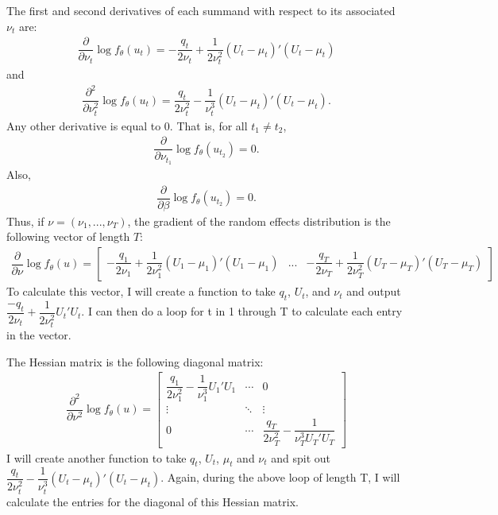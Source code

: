\documentclass{article}
\begin{document}

The first and second derivatives of each summand with respect to its associated $\nu_t$ are:
\begin{align}
\dfrac{\partial}{\partial \nu_t} \log f_\theta(u_t) = - \dfrac{q_t}{2 \nu_t} + \dfrac{1}{2 \nu_t^2}(U_t-\mu_t)'(U_t-\mu_t)
\end{align}
and 
\begin{align}
\dfrac{\partial^2}{\partial \nu_t^2} \log f_\theta(u_t) = \dfrac{q_t}{2 \nu_t^2}- \dfrac{1}{\nu_t^3} (U_t-\mu_t)'(U_t-\mu_t).
\end{align}
Any other derivative is equal to 0. That is, for all $t_1 \neq t_2$,
\begin{align}
\dfrac{\partial}{\partial \nu_{t_1}} \log f_\theta(u_{t_2}) = 0.
\end{align}
Also,
\begin{align}
\dfrac{\partial}{\partial \beta} \log f_\theta(u_{t_2}) = 0.
\end{align}
Thus, if $\nu = (\nu_1,...,\nu_T)$, the gradient of the random effects distribution is the following vector of length $T$:
\begin{align}
\dfrac{\partial}{\partial \nu}  \log f_\theta(u) = \begin{bmatrix} - \dfrac{q_1}{2 \nu_1} + \dfrac{1}{2 \nu_1^2} (U_1-\mu_1) ' (U_1-\mu_1) & ... & - \dfrac{q_T}{2 \nu_T} + \dfrac{1}{2 \nu_T^2} (U_T-\mu_T) '(U_T-\mu_T)   \end{bmatrix} 
\end{align}
To calculate this vector, I will create a function to take $q_t$, $U_t$, and $\nu_t$ and  output $\dfrac{-q_t}{2\nu_t} +\dfrac{1}{2 \nu_t^2} U_t'U_t$. I can then do a loop for t in 1 through T to calculate each entry in the vector.


The Hessian matrix is the following diagonal matrix:
\begin{align}
\dfrac{\partial^2}{\partial \nu^2} \log f_\theta(u) = \begin{bmatrix} \dfrac{q_1}{2 \nu_1^2}- \dfrac{1}{\nu_1^3} U_1'U_1 & \cdots & 0 \\ \vdots & \ddots & \vdots \\ 0 & \cdots & \dfrac{q_T}{2 \nu_T^2}- \dfrac{1}{\nu_T^3 U_T'U_T} \end{bmatrix}
\end{align}
I will create another function to take $q_t$, $U_t$, $\mu_t$ and $\nu_t$ and spit out $\dfrac{q_t}{2 \nu_t^2} - \dfrac{1}{\nu_t^3}  (U_t-\mu_t)' (U_t-\mu_t)$. Again, during the above loop of length T, I will calculate the entries for the diagonal of this Hessian matrix.
\end{document}
